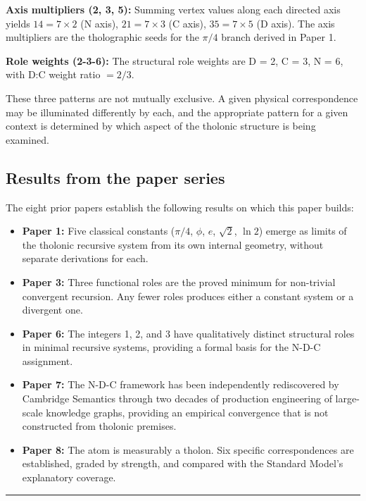 \documentclass[12pt]{article}
\providecommand{\tightlist}{%
  \setlength{\itemsep}{0pt}\setlength{\parskip}{0pt}}
\begin{document}
\textbf{Axis multipliers (2, 3, 5):} Summing vertex values along each
directed axis yields \(14 = 7 \times 2\) (N axis), \(21 = 7 \times 3\)
(C axis), \(35 = 7 \times 5\) (D axis). The axis multipliers are the
tholographic seeds for the \(\pi/4\) branch derived in Paper 1.

\textbf{Role weights (2-3-6):} The structural role weights are D = 2, C
= 3, N = 6, with D:C weight ratio \(= 2/3\).

These three patterns are not mutually exclusive. A given physical
correspondence may be illuminated differently by each, and the
appropriate pattern for a given context is determined by which aspect of
the tholonic structure is being examined.

\subsection{Results from the paper series}\label{results-from-the-paper-series}

The eight prior papers establish the following results on which this
paper builds:

\begin{itemize}
\tightlist
\item
  \textbf{Paper 1:} Five classical constants (\(\pi/4\), \(\phi\),
  \(e\), \(\sqrt{2}\), \(\ln 2\)) emerge as limits of the tholonic
  recursive system from its own internal geometry, without separate
  derivations for each.
\item
  \textbf{Paper 3:} Three functional roles are the proved minimum for
  non-trivial convergent recursion. Any fewer roles produces either a
  constant system or a divergent one.
\item
  \textbf{Paper 6:} The integers 1, 2, and 3 have qualitatively distinct
  structural roles in minimal recursive systems, providing a formal
  basis for the N-D-C assignment.
\item
  \textbf{Paper 7:} The N-D-C framework has been independently
  rediscovered by Cambridge Semantics through two decades of production
  engineering of large-scale knowledge graphs, providing an empirical
  convergence that is not constructed from tholonic premises.
\item
  \textbf{Paper 8:} The atom is measurably a tholon. Six specific
  correspondences are established, graded by strength, and compared with
  the Standard Model's explanatory coverage.
\end{itemize}

\begin{center}\rule{0.5\linewidth}{0.5pt}\end{center}
\end{document}
